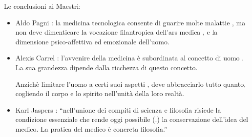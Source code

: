   Le conclusioni ai Maestri:

\begin{itemize}
\item
  Aldo Pagni : la medicina tecnologica consente di guarire molte
  malattie , ma non deve dimenticare la vocazione filantropica dell'ars
  medica , e la dimensione psico-affettiva ed emozionale dell'uomo.
\item
  Alexis Carrel : l'avvenire della medicina è subordinata al concetto di
  uomo . La sua grandezza dipende dalla ricchezza di questo concetto.

  Anzichè limitare l'uomo a certi suoi aspetti , deve abbracciarlo tutto
  quanto, cogliendo il corpo e lo spirito nell'unità della loro realtà.
\item
  Karl Jaspers : ``nell'unione dei compiti di scienza e filosofia
  risiede la condizione essenziale che rende oggi possibile (.) la
  conservazione dell'idea del medico. La pratica del medico è concreta
  filosofia.''
\end{itemize}
